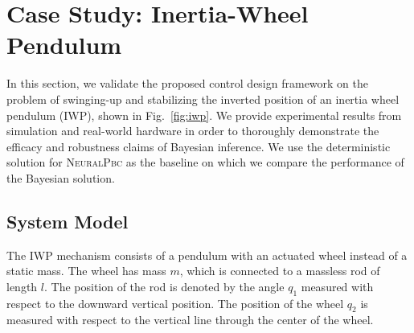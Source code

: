 \section{Case Study: Inertia-Wheel Pendulum}
\label{sec:iwp}

In this section, we validate the proposed control design framework on the
problem of swinging-up and stabilizing the inverted position of an inertia wheel
pendulum (IWP), shown in Fig.~\ref{fig:iwp}. We provide experimental results
from simulation and real-world hardware in order to thoroughly demonstrate the
efficacy and robustness claims of Bayesian inference. {
    \color{magenta}
    We use the deterministic solution for \textsc{NeuralPbc} as the baseline
    on which we compare the performance of the Bayesian solution.
}

\subsection{System Model}
\label{ssec:model}

The IWP mechanism consists of a pendulum with an actuated wheel instead of a static
mass.
%
The wheel has mass $m$, which is connected to a massless rod of length \(l\). 
%
The position of the rod is denoted by the angle \(q_1\) measured with
respect to the downward vertical position.
%
The position of the wheel \(q_2\) is measured with respect to the vertical
line through the center of the wheel.

